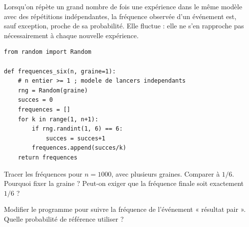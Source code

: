 \begin{keypoint}
Lorsqu'on répète un grand nombre de fois une expérience dans le même modèle avec des répétitions indépendantes, la fréquence observée d'un événement est, sauf exception, proche de sa probabilité. Elle fluctue : elle ne s'en rapproche pas nécessairement à chaque nouvelle expérience.
\end{keypoint}
\begin{lstlisting}
from random import Random

def frequences_six(n, graine=1):
    # n entier >= 1 ; modele de lancers independants
    rng = Random(graine)
    succes = 0
    frequences = []
    for k in range(1, n+1):
        if rng.randint(1, 6) == 6:
            succes = succes+1
        frequences.append(succes/k)
    return frequences
\end{lstlisting}
\begin{example}Tracer les fréquences pour $n=1000$, avec plusieurs graines. Comparer à $1/6$. Pourquoi fixer la graine ? Peut-on exiger que la fréquence finale soit exactement $1/6$ ?\end{example}
\begin{example}Modifier le programme pour suivre la fréquence de l'événement « résultat pair ». Quelle probabilité de référence utiliser ?\end{example}
